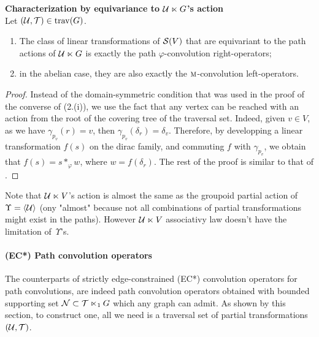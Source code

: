 \begin{proposition}\textbf{Characterization by equivariance to $\mathcal{U} \ltimes G$'s action}\\
Let $(\mathcal{U}, \mathcal{T}) \in \operatorname{trav}(G)$.
\begin{enumerate}[label=(\roman*)]
\item The class of linear transformations of $\mathcal{S}(V)$ that are equivariant to the path actions of $\mathcal{U} \ltimes G$ is exactly the path $\varphi$-convolution right-operators;
\item in the abelian case, they are also exactly the $\operatorname{\textsc{m}}$-convolution left-operators.
\end{enumerate}
\end{proposition}

\begin{proof}
Instead of the domain-symmetric condition that was used in the proof of the converse of  (2.(i)), we use the fact that any vertex can be reached with an action from the root of the covering tree of the traversal set. Indeed, given $v \in V$, as we have $\gamma_{p_v}(r)=v$, then $\gamma_{p_v}(\delta_r) = \delta_v$. Therefore, by developping a linear transformation $f(s)$ on the dirac family, and commuting $f$ with $\gamma_{p_v}$, we obtain that $f(s) = s \ast_\varphi w$, where $w = f(\delta_r)$. The rest of the proof is similar to that of .
\end{proof}

\begin{remark}
Note that $\mathcal{U} \ltimes V$'s action is almost the same as the groupoid partial action of $\Upsilon = \langle \mathcal{U} \rangle$ (ony "almost" because not all combinations of partial transformations might exist in the paths). However $\mathcal{U} \ltimes V$ associativy law doesn't have the limitation of~$\Upsilon$'s.
\end{remark}

\paragraph{(EC*) Path convolution operators}
The counterparts of strictly edge-constrained (EC*) convolution operators for path convolutions, are indeed path convolution operators obtained with bounded supporting set $\mathcal{N} \subset \mathcal{T} \ltimes_1 G$ which any graph can admit. As shown by this section, to construct one, all we need is a traversal set of partial transformations $(\mathcal{U}, \mathcal{T})$.

